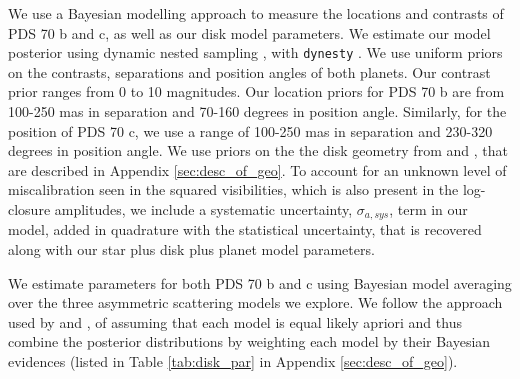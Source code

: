 \documentclass[11pt,twocolumn,twocolappendix]{aastex631}
\begin{document}
{We use a Bayesian modelling approach to measure the locations and contrasts of PDS 70 b and c, as well as our disk model parameters. We estimate our model posterior using dynamic nested sampling \citep{dyn2018}, with \texttt{dynesty} \citep{2020MNRAS.493.3132S,sergey_koposov_2023_7600689}.} {We use uniform priors on the contrasts, separations and position angles of both planets. Our contrast prior ranges from 0 to 10 magnitudes. Our location priors for PDS 70 b are from 100-250 mas in separation and 70-160 degrees in position angle. Similarly, for the position of PDS 70 c, we use a range of 100-250 mas in separation and 230-320 degrees in position angle.} %
We use priors on the the disk geometry from \cite{kep1} and \cite{kep2}, that are described in Appendix \ref{sec:desc_of_geo}. {To account for an unknown level of miscalibration seen in the squared visibilities, which is also present in the log-closure amplitudes, we include a systematic uncertainty, $\sigma_{a,sys}$, term in our model, added in quadrature with the statistical uncertainty, that is recovered along with our star plus disk plus planet model parameters. }

{We estimate parameters for both PDS 70 b and c using Bayesian model averaging over the three asymmetric scattering models we explore.  We follow the approach used by \cite{2024ApJ...966..156N} and \cite{2024A&A...687A.298N}, of assuming that each model is equal likely apriori and thus combine the posterior distributions by weighting each model by their Bayesian evidences (listed in Table \ref{tab:disk_par} in Appendix \ref{sec:desc_of_geo}).}


\end{document}
